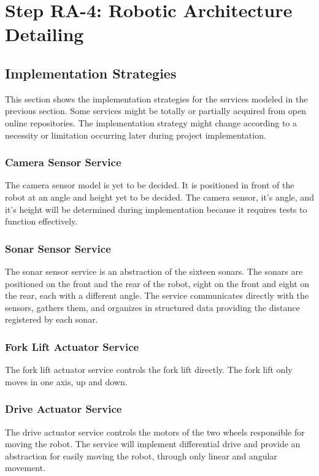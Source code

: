 \section{Step RA-4: Robotic Architecture Detailing}
\subsection{Implementation Strategies}
This section shows the implementation strategies for the services modeled in the previous section. Some services might be totally or partially acquired from open online repositories. The implementation strategy might change according to a necessity or limitation occurring later during project implementation.

\subsubsection*{Camera Sensor Service}
The camera sensor model is yet to be decided. It is positioned in front of the robot at an angle and height yet to be decided. The camera sensor, it's angle, and it's height will be determined during implementation because it requires tests to function effectively. 
\subsubsection*{Sonar Sensor Service}
The sonar sensor service is an abstraction of the sixteen sonars. The sonars are positioned on the front and the rear of the robot, eight on the front and eight on the rear, each with a different angle. The service communicates directly with the sensors, gathers them, and organizes in structured data providing the distance registered by each sonar.
\subsubsection*{Fork Lift Actuator Service}
The fork lift actuator service controls the fork lift directly. The fork lift only moves in one axis, up and down.
\subsubsection*{Drive Actuator Service}
The drive actuator service controls the motors of the two wheels responsible for moving the robot. The service will implement differential drive and provide an abstraction for easily moving the robot, through only linear and angular movement.

